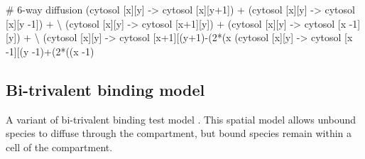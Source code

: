 \begin{kappasource}


# 6-way diffusion
    (cytosol [x][y] -> cytosol [x][y+1]) + (cytosol [x][y] -> cytosol [x][y -1]) + {\textbackslash}
    (cytosol [x][y] -> cytosol [x+1][y]) + (cytosol [x][y] -> cytosol [x -1][y]) + {\textbackslash}
    (cytosol [x][y] -> cytosol [x+1][(y+1)-(2*(x%
    (cytosol [x][y] -> cytosol [x -1][(y -1)+(2*((x -1)%



\end{kappasource}


\subsection{Bi-trivalent binding model}
\label{sec:bitrivalent}


A variant of bi-trivalent binding test model \citep{yang2008kinetic}. This spatial model allows unbound species to diffuse through the compartment, but bound species remain within a cell of the compartment.


